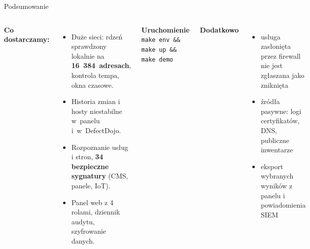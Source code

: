 \documentclass[aspectratio=169,11pt]{beamer}
\newcommand{\cmd}[1]{\texttt{\small #1}}
\begin{document}
\begin{frame}{Podsumowanie}
  \begin{columns}[T]
    \textbf{Co dostarczamy:}
    \begin{itemize}\small
      \item Duże sieci: rdzeń sprawdzony lokalnie na \textbf{16~384~adresach}, kontrola tempa, okna czasowe.
      \item Historia zmian i hosty niestabilne w~panelu i~w~DefectDojo.
      \item Rozpoznanie usług i stron, \textbf{34 bezpieczne sygnatury} (CMS, panele, IoT).
      \item Panel web z 4 rolami, dziennik audytu, szyfrowanie danych.
    \end{itemize}
    \textbf{Uruchomienie}\\
    \cmd{make env \&\& make up \&\& make demo}

    \medskip
    \textbf{Dodatkowo}
    \begin{itemize}\footnotesize
      \item usługa zasłonięta przez firewall nie jest zgłaszana jako zniknięta
      \item źródła pasywne: logi certyfikatów, DNS, publiczne inwentarze
      \item eksport wybranych wyników z panelu i powiadomienia SIEM
    \end{itemize}

  \end{columns}
\end{frame}
\end{document}
